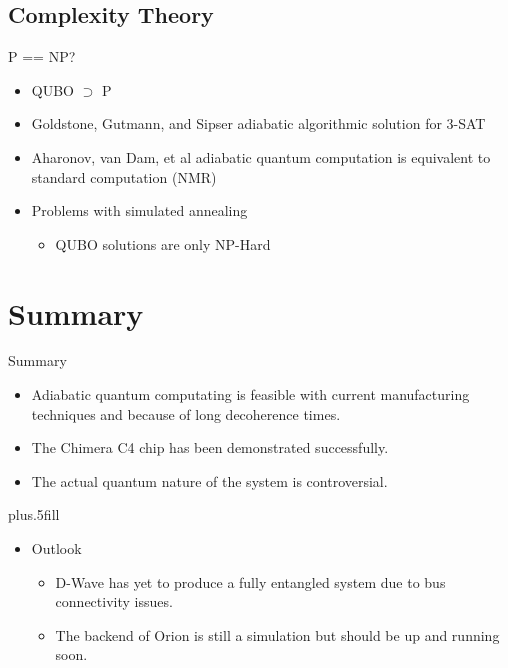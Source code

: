 \documentclass{beamer}
\begin{document}
\subsection{Complexity Theory}

\begin{frame}{P == NP?}
 \begin{itemize}
  \item QUBO \(\supset\) P
  \item Goldstone, Gutmann, and Sipser adiabatic algorithmic solution for 3-SAT
  \item Aharonov, van Dam, et al adiabatic quantum computation is equivalent to standard computation (NMR)
  \item Problems with simulated annealing
  \begin{itemize}
   \item QUBO solutions are only NP-Hard
  \end{itemize}


 \end{itemize}

\end{frame}


\section*{Summary}

\begin{frame}{Summary}

  \begin{itemize}
  \item
    Adiabatic quantum computating is feasible with current manufacturing techniques and because of long decoherence times.
  \item
    The Chimera C4 chip has been demonstrated successfully.
  \item
    The actual quantum nature of the system is controversial.
  \end{itemize}
  
  \vskip0pt plus.5fill
  \begin{itemize}
  \item
    Outlook
    \begin{itemize}
    \item
      D-Wave has yet to produce a fully entangled system due to bus connectivity issues.
    \item
      The backend of Orion is still a simulation but should be up and running soon.
    \end{itemize}
  \end{itemize}
\end{frame}
\end{document}
